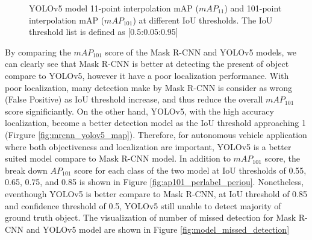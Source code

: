 \begin{figure}[!ht]
    \centering
    \quad
    \caption{YOLOv5 model 11-point interpolation mAP ($mAP_{11}$) and 101-point interpolation mAP ($mAP_{101}$) at different IoU thresholds. The IoU threshold list is defined as [0.5:0.05:0.95]}  \label{fig:yolov5_map}
\end{figure}

By comparing the $mAP_{101}$ score of the Mask R-CNN and YOLOv5 models, we can clearly see that Mask R-CNN is better at detecting the present of object compare to YOLOv5, however it have a poor localization performance. With poor localization, many detection make by Mask R-CNN is consider as wrong (False Positive) as IoU threshold increase, and thus reduce the overall $mAP_{101}$ score significiantly. On the other hand, YOLOv5, with the high accuracy localization, become a better detection model as the IoU threshold approaching 1 (Firgure \ref{fig:mrcnn_yolov5_map}). Therefore, for autonomous vehicle application where both objectiveness and localization are important, YOLOv5 is a better suited model compare to Mask R-CNN model. In addition to $mAP_{101}$ score, the break down $AP_{101}$ score for each class of the two model at IoU thresholds of 0.55, 0.65, 0.75, and 0.85 is shown in Figure \ref{fig:ap101_perlabel_periou}. Nonetheless, eventhough YOLOv5 is better compare to Mask R-CNN, at IoU threshold of 0.85 and confidence threshold of 0.5, YOLOv5 still unable to detect majority of ground truth object. The visualization of number of missed detection for Mask R-CNN and YOLOv5 model are shown in Figure \ref{fig:model_missed_detection}

